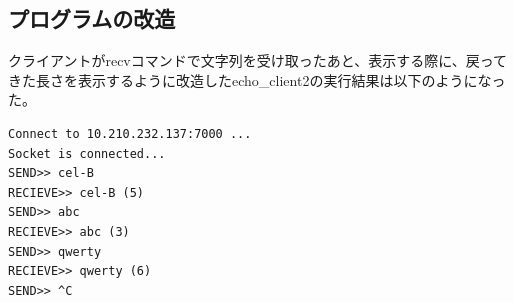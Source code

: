 \documentclass[a4j]{celb-report}
\begin{document}
\subsection{プログラムの改造}
クライアントがrecvコマンドで文字列を受け取ったあと、表示する際に、戻ってきた長さを表示するように改造したecho\_client2の実行結果は以下のようになった。
\begin{lstlisting}[basicstyle=\ttfamily\footnotesize, frame=single]
Connect to 10.210.232.137:7000 ...
Socket is connected...
SEND>> cel-B
RECIEVE>> cel-B (5)
SEND>> abc
RECIEVE>> abc (3)
SEND>> qwerty
RECIEVE>> qwerty (6)
SEND>> ^C
\end{lstlisting}

\end{document}
